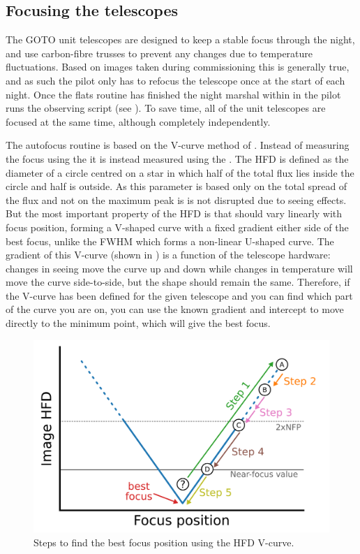 \subsection{Focusing the telescopes}
\label{sec:autofocus}
\begin{colsection}

The GOTO unit telescopes are designed to keep a stable focus through the night, and use carbon-fibre trusses to prevent any changes due to temperature fluctuations. Based on images taken during commissioning this is generally true, and as such the pilot only has to refocus the telescope once at the start of each night. Once the flats routine has finished the night marshal within in the pilot runs the  observing script (see ). To save time, all of the unit telescopes are focused at the same time, although completely independently.

The autofocus routine is based on the V-curve method of \citet{autofocus}. Instead of measuring the focus using the  it is instead measured using the . The HFD is defined as the diameter of a circle centred on a star in which half of the total flux lies inside the circle and half is outside. As this parameter is based only on the total spread of the flux and not on the maximum peak is is not disrupted due to seeing effects. But the most important property of the HFD is that should vary linearly with focus position, forming a V-shaped curve with a fixed gradient either side of the best focus, unlike the FWHM which forms a non-linear U-shaped curve. The gradient of this V-curve (shown in ) is a function of the telescope hardware: changes in seeing move the curve up and down while changes in temperature will move the curve side-to-side, but the shape should remain the same. Therefore, if the V-curve has been defined for the given telescope and you can find which part of the curve you are on, you can use the known gradient and intercept to move directly to the minimum point, which will give the best focus.

\begin{figure}[t]
    \begin{center}
        \includegraphics[width=0.8\linewidth]{images/autofocus.pdf}
    \end{center}
    \caption[Steps to find the best focus position using the HFD V-curve]{
        Steps to find the best focus position using the HFD V-curve.
    }\label{fig:autofocus}
\end{figure}


\end{colsection}
